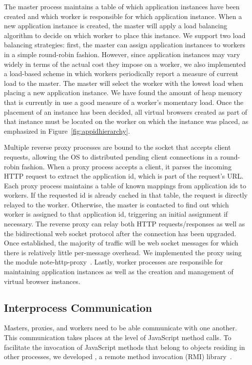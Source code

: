The master process maintains a table of which application instances have been created and which
worker is responsible for which application instance.  When a new application instance is created,
the master will apply a load balancing algorithm to decide on which worker to place this instance.  
We support two load balancing strategies: first, the master can assign application instances
to workers in a simple round-robin fashion.  However, since application instances may vary
widely in terms of the actual cost they impose on a worker, we also implemented a load-based
scheme in which workers periodically report a measure of current load to the master.
The master will select the worker with the lowest load when placing a new application instance.
We have found the amount of heap memory that is currently in use a good measure of a worker's 
momentary load.  Once the placement of an instance has been decided, all
virtual browsers created as part of that instance must be located on the worker on which the instance
was placed, as emphasized in Figure~\ref{fig:appidhierarchy}.

Multiple reverse proxy processes are bound to the socket that accepts client requests, allowing
the OS to distributed pending client connections in a round-robin fashion.  
When a proxy process accepts a client, it parses the incoming HTTP request to extract the application
id, which is part of the request's URL.  Each proxy process maintains a table of known mappings from 
application ids to workers.  If the requested id is already cached in that table, the request is directly
relayed to the worker.  Otherwise, the master is contacted to find out which worker is assigned
to that application id, triggering an initial assignment if necessary.  The reverse proxy can 
relay both HTTP requests/responses as well as the bidirectional web socket protocol after the
connection has been upgraded.  Once established, the majority of traffic will be web socket
messages for which there is relatively little per-message overhead.  We implemented the proxy 
using the \nodejs{} module note-http-proxy~\cite{nodeproxy}.
Lastly, worker processes are responsible for maintaining application instances as well as the
creation and management of virtual browser instances.


\subsection{Interprocess Communication}
Masters, proxies, and workers need to be able communicate with one another. 
This communication takes places at the level of JavaScript method calls.
To facilitate the invocation of JavaScript methods that belong to objects residing 
in other processes, we developed \nodermi, a remote method invocation (RMI) 
library~\cite{nodermi}.

